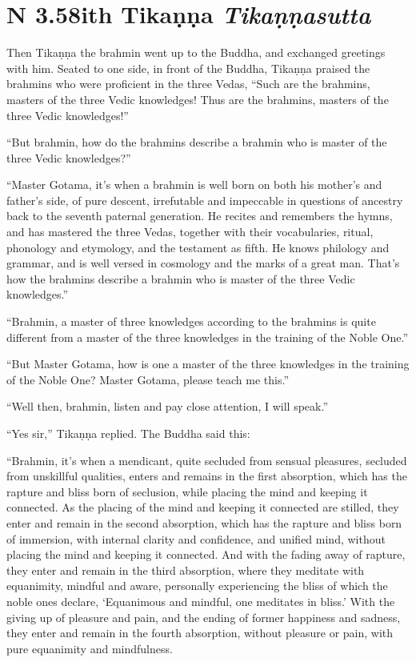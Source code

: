 \documentclass[12pt,openany]{book}%
\newcommand*{\suttatitleacronym}[1]{\smaller[2]{#1}\vspace*{.3em}}
\newcommand*{\suttatitletranslation}[1]{\linebreak{#1}}
\newcommand*{\suttatitleroot}[1]{\linebreak\smaller[2]\itshape{#1}}
\newcommand*{\tocacronym}[1]{\hspace*{-3.3em}{#1}\quad}
\newcommand*{\toctranslation}[1]{#1}
\newcommand*{\tocroot}[1]{(\textit{#1})}
\begin{document}
%
\section*{{\suttatitleacronym AN 3.58}{\suttatitletranslation With Tikaṇṇa }{\suttatitleroot Tikaṇṇasutta}}
\addcontentsline{toc}{section}{\tocacronym{AN 3.58} \toctranslation{With Tikaṇṇa } \tocroot{Tikaṇṇasutta}}

Then \textsanskrit{Tikaṇṇa} the brahmin went up to the Buddha, and exchanged greetings with him. Seated to one side, in front of the Buddha, \textsanskrit{Tikaṇṇa} praised the brahmins who were proficient in the three Vedas, “Such are the brahmins, masters of the three Vedic knowledges! Thus are the brahmins, masters of the three Vedic knowledges!” 

“But brahmin, how do the brahmins describe a brahmin who is master of the three Vedic knowledges?” 

“Master Gotama, it’s when a brahmin is well born on both his mother’s and father’s side, of pure descent, irrefutable and impeccable in questions of ancestry back to the seventh paternal generation. He recites and remembers the hymns, and has mastered the three Vedas, together with their vocabularies, ritual, phonology and etymology, and the testament as fifth. He knows philology and grammar, and is well versed in cosmology and the marks of a great man. That’s how the brahmins describe a brahmin who is master of the three Vedic knowledges.” 

“Brahmin, a master of three knowledges according to the brahmins is quite different from a master of the three knowledges in the training of the Noble One.” 

“But Master Gotama, how is one a master of the three knowledges in the training of the Noble One? Master Gotama, please teach me this.” 

“Well then, brahmin, listen and pay close attention, I will speak.” 

“Yes sir,” \textsanskrit{Tikaṇṇa} replied. The Buddha said this: 

“Brahmin, it’s when a mendicant, quite secluded from sensual pleasures, secluded from unskillful qualities, enters and remains in the first absorption, which has the rapture and bliss born of seclusion, while placing the mind and keeping it connected. As the placing of the mind and keeping it connected are stilled, they enter and remain in the second absorption, which has the rapture and bliss born of immersion, with internal clarity and confidence, and unified mind, without placing the mind and keeping it connected. And with the fading away of rapture, they enter and remain in the third absorption, where they meditate with equanimity, mindful and aware, personally experiencing the bliss of which the noble ones declare, ‘Equanimous and mindful, one meditates in bliss.’ With the giving up of pleasure and pain, and the ending of former happiness and sadness, they enter and remain in the fourth absorption, without pleasure or pain, with pure equanimity and mindfulness. 
\end{document}
